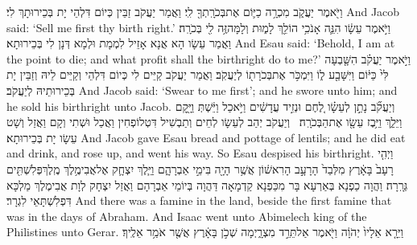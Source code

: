 {וַיֹּ֖אמֶר יַעֲקֹ֑ב מִכְרָ֥ה כַיּ֛וֹם אֶת\maqqaf בְּכֹרָֽתְךָ֖ לִֽי׃}
{וַאֲמַר יַעֲקֹב זַבֵּין כְּיוֹם דִּלְהֵי יָת בְּכֵירוּתָךְ לִי׃}
{And Jacob said: ‘Sell me first thy birth right.’}{}
{וַיֹּ֣אמֶר עֵשָׂ֔ו הִנֵּ֛ה אָנֹכִ֥י הוֹלֵ֖ךְ לָמ֑וּת וְלָמָּה\maqqaf זֶּ֥ה לִ֖י בְּכֹרָֽה׃}
{וַאֲמַר עֵשָׂו הָא אֲנָא אָזֵיל לִמְמָת וּלְמָא דְּנָן לִי בְּכֵירוּתָא׃}
{And Esau said: ‘Behold, I am at the point to die; and what profit shall the birthright do to me?’}{}
{וַיֹּ֣אמֶר יַעֲקֹ֗ב הִשָּׁ֤בְעָה לִּי֙ כַּיּ֔וֹם וַיִּשָּׁבַ֖ע ל֑וֹ וַיִּמְכֹּ֥ר אֶת\maqqaf בְּכֹרָת֖וֹ לְיַעֲקֹֽב׃}
{וַאֲמַר יַעֲקֹב קַיֵּים לִי כְּיוֹם דִּלְהֵי וְקַיֵּים לֵיהּ וְזַבֵּין יָת בְּכֵירוּתֵיהּ לְיַעֲקֹב׃}
{And Jacob said: ‘Swear to me first’; and he swore unto him; and he sold his birthright unto Jacob.}{}
{וְיַעֲקֹ֞ב נָתַ֣ן לְעֵשָׂ֗ו לֶ֚חֶם וּנְזִ֣יד עֲדָשִׁ֔ים וַיֹּ֣אכַל וַיֵּ֔שְׁתְּ וַיָּ֖קׇם וַיֵּלַ֑ךְ וַיִּ֥בֶז עֵשָׂ֖ו אֶת\maqqaf הַבְּכֹרָֽה׃ \petucha }
{וְיַעֲקֹב יְהַב לְעֵשָׂו לְחֵים וְתַבְשִׁיל דִּטְלוֹפְחִין וַאֲכַל וּשְׁתִי וְקָם וַאֲזַל וְשָׁט עֵשָׂו יָת בְּכֵירוּתָא׃}
{And Jacob gave Esau bread and pottage of lentils; and he did eat and drink, and rose up, and went his way. So Esau despised his birthright.}{}
\newperek
{}%
{וַיְהִ֤י רָעָב֙ בָּאָ֔רֶץ מִלְּבַד֙ הָרָעָ֣ב הָרִאשׁ֔וֹן אֲשֶׁ֥ר הָיָ֖ה בִּימֵ֣י אַבְרָהָ֑ם וַיֵּ֧לֶךְ יִצְחָ֛ק אֶל\maqqaf אֲבִימֶ֥לֶךְ מֶֽלֶךְ\maqqaf פְּלִשְׁתִּ֖ים גְּרָֽרָה׃}
{וַהֲוָה כַפְנָא בְּאַרְעָא בָּר מִכַּפְנָא קַדְמָאָה דַּהֲוָה בְּיוֹמֵי אַבְרָהָם וַאֲזַל יִצְחָק לְוָת אֲבִימֶלֶךְ מַלְכָּא דִּפְלִשְׁתָּאֵי לִגְרָר׃}
{And there was a famine in the land, beside the first famine that was in the days of Abraham. And Isaac went unto Abimelech king of the Philistines unto Gerar.}{}
{וַיֵּרָ֤א אֵלָיו֙ יְהֹוָ֔ה וַיֹּ֖אמֶר אַל\maqqaf תֵּרֵ֣ד מִצְרָ֑יְמָה שְׁכֹ֣ן בָּאָ֔רֶץ אֲשֶׁ֖ר אֹמַ֥ר אֵלֶֽיךָ׃}
